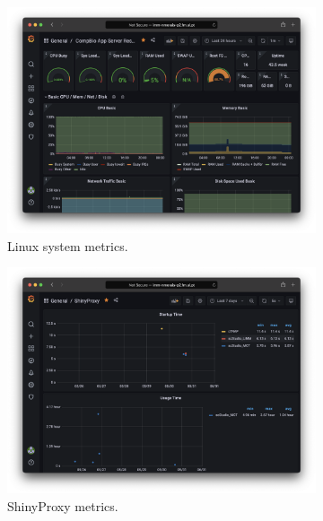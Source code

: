\begin{figure}[!ht]
	\centering
	\begin{subfigure}[h]{0.45\textwidth} 
		\includegraphics[width=\textwidth]{images/app-server/grafana-system}
		\caption{Linux system metrics.}
	\end{subfigure}
	\begin{subfigure}[h]{0.45\textwidth}
		\includegraphics[width=\textwidth]{images/app-server/grafana-shinyproxy}
		\caption{ShinyProxy metrics.}
	\end{subfigure}
	\begin{subfigure}[h]{0.45\textwidth}

\end{subfigure}
\end{figure}
